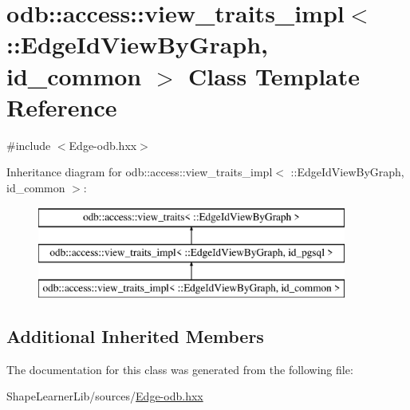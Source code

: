\hypertarget{classodb_1_1access_1_1view__traits__impl_3_01_1_1_edge_id_view_by_graph_00_01id__common_01_4}{}\section{odb\+:\+:access\+:\+:view\+\_\+traits\+\_\+impl$<$ \+:\+:Edge\+Id\+View\+By\+Graph, id\+\_\+common $>$ Class Template Reference}
\label{classodb_1_1access_1_1view__traits__impl_3_01_1_1_edge_id_view_by_graph_00_01id__common_01_4}


{\ttfamily \#include $<$Edge-\/odb.\+hxx$>$}

Inheritance diagram for odb\+:\+:access\+:\+:view\+\_\+traits\+\_\+impl$<$ \+:\+:Edge\+Id\+View\+By\+Graph, id\+\_\+common $>$\+:\begin{figure}[H]
\begin{center}
\leavevmode
\includegraphics[height=3.000000cm]{df/d97/classodb_1_1access_1_1view__traits__impl_3_01_1_1_edge_id_view_by_graph_00_01id__common_01_4}
\end{center}
\end{figure}
\subsection*{Additional Inherited Members}


The documentation for this class was generated from the following file\+:\begin{DoxyCompactItemize}
\item 
Shape\+Learner\+Lib/sources/\hyperlink{_edge-odb_8hxx}{Edge-\/odb.\+hxx}\end{DoxyCompactItemize}
